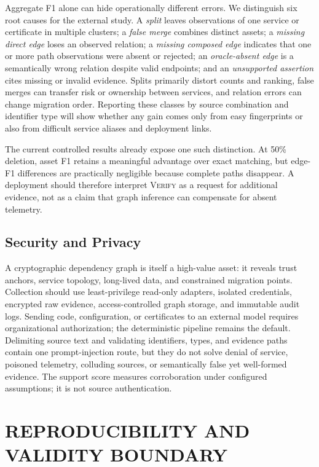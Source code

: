 \documentclass[a4paper,twoside]{article}
\newcommand{\verify}{\textsc{Verify}\xspace}
\begin{document}
Aggregate F1 alone can hide operationally different errors. We distinguish six root causes for the external study. A \emph{split} leaves observations of one service or certificate in multiple clusters; a \emph{false merge} combines distinct assets; a \emph{missing direct edge} loses an observed relation; a \emph{missing composed edge} indicates that one or more path observations were absent or rejected; an \emph{oracle-absent edge} is a semantically wrong relation despite valid endpoints; and an \emph{unsupported assertion} cites missing or invalid evidence. Splits primarily distort counts and ranking, false merges can transfer risk or ownership between services, and relation errors can change migration order. Reporting these classes by source combination and identifier type will show whether any gain comes only from easy fingerprints or also from difficult service aliases and deployment links.

The current controlled results already expose one such distinction. At 50\% deletion, asset F1 retains a meaningful advantage over exact matching, but edge-F1 differences are practically negligible because complete paths disappear. A deployment should therefore interpret \verify as a request for additional evidence, not as a claim that graph inference can compensate for absent telemetry.

\subsection{Security and Privacy}

A cryptographic dependency graph is itself a high-value asset: it reveals trust anchors, service topology, long-lived data, and constrained migration points. Collection should use least-privilege read-only adapters, isolated credentials, encrypted raw evidence, access-controlled graph storage, and immutable audit logs. Sending code, configuration, or certificates to an external model requires organizational authorization; the deterministic pipeline remains the default. Delimiting source text and validating identifiers, types, and evidence paths contain one prompt-injection route, but they do not solve denial of service, poisoned telemetry, colluding sources, or semantically false yet well-formed evidence. The support score measures corroboration under configured assumptions; it is not source authentication.

\section{\uppercase{Reproducibility and Validity Boundary}}
\label{sec:repro}
\end{document}

